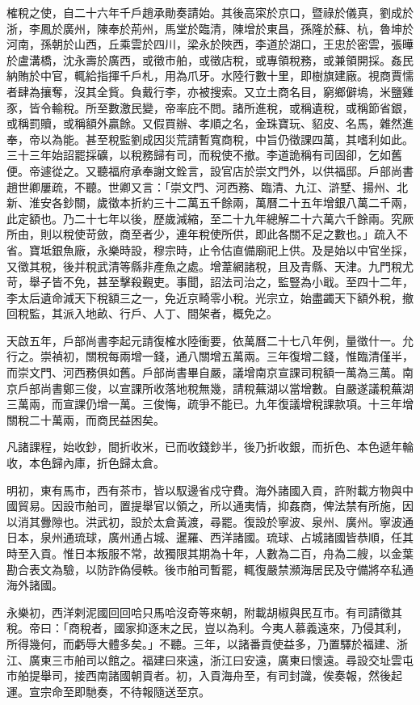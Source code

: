 榷稅之使，自二十六年千戶趙承勛奏請始。其後高寀於京口，暨祿於儀真，劉成於浙，李鳳於廣州，陳奉於荊州，馬堂於臨清，陳增於東昌，孫隆於蘇、杭，魯坤於河南，孫朝於山西，丘乘雲於四川，梁永於陜西，李道於湖口，王忠於密雲，張曄於盧溝橋，沈永壽於廣西，或徵市舶，或徵店稅，或專領稅務，或兼領開採。姦民納賄於中官，輒給指揮千戶札，用為爪牙。水陸行數十里，即樹旗建廠。視商賈懦者肆為攘奪，沒其全貲。負戴行李，亦被搜索。又立土商名目，窮鄉僻塢，米鹽雞豕，皆令輸稅。所至數激民變，帝率庇不問。諸所進稅，或稱遺稅，或稱節省銀，或稱罰贖，或稱額外贏餘。又假買辦、孝順之名，金珠寶玩、貂皮、名馬，雜然進奉，帝以為能。甚至稅監劉成因災荒請暫寬商稅，中旨仍徵課四萬，其嗜利如此。三十三年始詔罷採礦，以稅務歸有司，而稅使不撤。李道詭稱有司固卻，乞如舊便。帝遽從之。又聽福府承奉謝文銓言，設官店於崇文門外，以供福邸。戶部尚書趙世卿屢疏，不聽。世卿又言：「崇文門、河西務、臨清、九江、滸墅、揚州、北新、淮安各鈔關，歲徵本折約三十二萬五千餘兩，萬曆二十五年增銀八萬二千兩，此定額也。乃二十七年以後，歷歲減縮，至二十九年總解二十六萬六千餘兩。究厥所由，則以稅使苛斂，商至者少，連年稅使所供，即此各關不足之數也。」疏入不省。寶坻銀魚廠，永樂時設，穆宗時，止令估直備廟祀上供。及是始以中官坐採，又徵其稅，後并稅武清等縣非產魚之處。增葦網諸稅，且及青縣、天津。九門稅尤苛，舉子皆不免，甚至擊殺覲吏。事聞，詔法司治之，監豎為小戢。至四十二年，李太后遺命減天下稅額三之一，免近京畸零小稅。光宗立，始盡蠲天下額外稅，撤回稅監，其派入地畝、行戶、人丁、間架者，概免之。

天啟五年，戶部尚書李起元請復榷水陸衝要，依萬曆二十七八年例，量徵什一。允行之。崇禎初，關稅每兩增一錢，通八關增五萬兩。三年復增二錢，惟臨清僅半，而崇文門、河西務俱如舊。戶部尚書畢自嚴，議增南京宣課司稅額一萬為三萬。南京戶部尚書鄭三俊，以宣課所收落地稅無幾，請稅蕪湖以當增數。自嚴遂議稅蕪湖三萬兩，而宣課仍增一萬。三俊悔，疏爭不能已。九年復議增稅課款項。十三年增關稅二十萬兩，而商民益困矣。

凡諸課程，始收鈔，間折收米，已而收錢鈔半，後乃折收銀，而折色、本色遞年輪收，本色歸內庫，折色歸太倉。

明初，東有馬市，西有茶市，皆以馭邊省戍守費。海外諸國入貢，許附載方物與中國貿易。因設市舶司，置提舉官以領之，所以通夷情，抑姦商，俾法禁有所施，因以消其釁隙也。洪武初，設於太倉黃渡，尋罷。復設於寧波、泉州、廣州。寧波通日本，泉州通琉球，廣州通占城、暹羅、西洋諸國。琉球、占城諸國皆恭順，任其時至入貢。惟日本叛服不常，故獨限其期為十年，人數為二百，舟為二艘，以金葉勘合表文為驗，以防詐偽侵軼。後市舶司暫罷，輒復嚴禁瀕海居民及守備將卒私通海外諸國。

永樂初，西洋剌泥國回回哈只馬哈沒奇等來朝，附載胡椒與民互市。有司請徵其稅。帝曰：「商稅者，國家抑逐末之民，豈以為利。今夷人慕義遠來，乃侵其利，所得幾何，而虧辱大體多矣。」不聽。三年，以諸番貢使益多，乃置驛於福建、浙江、廣東三市舶司以館之。福建曰來遠，浙江曰安遠，廣東曰懷遠。尋設交址雲屯市舶提舉司，接西南諸國朝貢者。初，入貢海舟至，有司封識，俟奏報，然後起運。宣宗命至即馳奏，不待報隨送至京。

